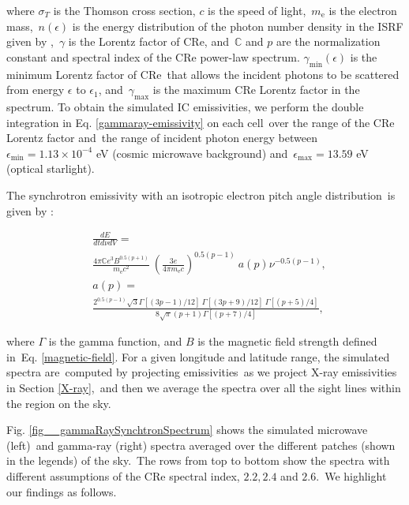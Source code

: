 \documentclass[fleqn,usenatbib,useAMS]{mnras}
\begin{document}
where $\sigma_{T}$ is the Thomson cross section, $c$ is the speed of light,\
$m_{\text{e}}$ is the electron mass,\
$n(\epsilon)$ is the energy distribution of the photon number density in the ISRF given by \citet{Porter2017},\
$\gamma$ is the Lorentz factor of CRe, and\
$\mathbb{C}$ and $p$ are the normalization constant and spectral index of the CRe power-law spectrum.
$\gamma_{\text{min}}(\epsilon)$ is the minimum Lorentz factor of CRe\
that allows the incident photons to be scattered from energy $\epsilon$ to $\epsilon_{1}$, and\
$\gamma_{\text{max}}$ is the maximum CRe Lorentz factor in the spectrum. To obtain the simulated IC emissivities, we perform the double integration in Eq. \ref{gammaray-emissivity} on each cell\
over the range of the CRe Lorentz factor and\
the range of incident photon energy between\
$\epsilon_{\text{min}}=1.13\times10^{-4}$ eV (cosmic microwave background) and\
$\epsilon_{\text{max}}=13.59$ eV (optical starlight).\


The synchrotron emissivity with an isotropic electron pitch angle distribution\
is given by \citet{BLUMENTHAL1970}:

\begin{subequations}
   \begin{align}
      &\frac{dE}{dtd\nu dV} =\nonumber\\
      &\frac{4\pi\mathbb{C}e^{3}B^{0.5(p+1)}}{m_{\text{e}}c^{2}}\
      \left(\frac{3e}{4\pi m_{\text{e}}c}\right)^{0.5(p-1)}\
      a(p)\nu^{-0.5(p-1)},\\
      &a(p)=\nonumber\\
           &\frac{2^{0.5(p-1)}\sqrt{3}\Gamma\left[\left(3p-1\right)/12\right]\
                                      \Gamma\left[\left(3p+9\right)/12\right]\
                                      \Gamma\left[\left(p+5\right)/4\right]}
      {8\sqrt{\pi}(p+1)\Gamma\left[\left(p+7\right)/4\right]},
   \end{align}
   \label{synchrotron-emissivity}
\end{subequations}

where $\Gamma$ is the gamma function, and $B$ is the magnetic field strength defined in\
Eq. \ref{magnetic-field}. For a given longitude and latitude range, the simulated spectra are\
computed by projecting emissivities\
as we project X-ray emissivities in Section \ref{X-ray},\
and then we average the spectra over all the sight lines within the region on the sky.


Fig. \ref{fig__gammaRaySynchtronSpectrum} shows the simulated microwave (left)\
and gamma-ray (right) spectra averaged over the different patches (shown in the legends) of the sky.\
The rows from top to bottom show the spectra with different assumptions of the CRe spectral index, $2.2, 2.4$ and $2.6$.\
We highlight our findings as follows.\
\end{document}
